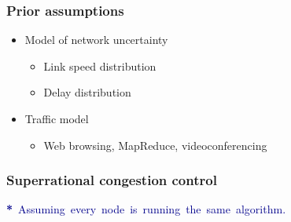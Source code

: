 \documentclass[svgnames]{beamer}
\newcommand{\ssline}{\vspace{8 pt}}
\begin{document}
\begin{frame}
\frametitle{Prior assumptions}

\begin{itemize}

\Large

\item Model of network uncertainty

\begin{itemize}
\item Link speed distribution
\item Delay distribution
\end{itemize}

\item Traffic model

\begin{itemize}
\item Web browsing, MapReduce, videoconferencing
\end{itemize}

\end{itemize}

\end{frame}

%
%
%
%
%
%
%
%

\begin{frame}
\frametitle{Superrational congestion control}

\begin{centering}

\ssline
\ssline
\ssline

\end{centering}

\Large \noindent \hspace{-.5cm} \mbox{\textcolor{DarkBlue}{\textbf{*} Assuming every node is running the same algorithm.}}

\end{frame}
\end{document}
